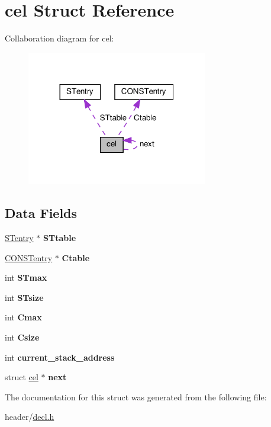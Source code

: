 \hypertarget{structcel}{}\section{cel Struct Reference}
\label{structcel}


Collaboration diagram for cel\+:\nopagebreak
\begin{figure}[H]
\begin{center}
\leavevmode
\includegraphics[width=224pt]{structcel__coll__graph}
\end{center}
\end{figure}
\subsection*{Data Fields}
\begin{DoxyCompactItemize}
\item 
\mbox{\label{structcel_a6812d40652d2bac79cfa87079b8cb7b9}} 
\hyperlink{struct_s_tentry}{S\+Tentry} $\ast$ {\bfseries S\+Ttable}
\item 
\mbox{\label{structcel_a83cd4ff203668f9dbbed335c25af0d64}} 
\hyperlink{struct_c_o_n_s_tentry}{C\+O\+N\+S\+Tentry} $\ast$ {\bfseries Ctable}
\item 
\mbox{\label{structcel_adbb368ad027ec24104f6cd5f7f7d2c0d}} 
int {\bfseries S\+Tmax}
\item 
\mbox{\label{structcel_a4a9f95fa763ad7614424fccd9b8d00a6}} 
int {\bfseries S\+Tsize}
\item 
\mbox{\label{structcel_a708c0152509a4fc390cc7904be927b58}} 
int {\bfseries Cmax}
\item 
\mbox{\label{structcel_a64088910a6c1c39223f36d17273377f3}} 
int {\bfseries Csize}
\item 
\mbox{\label{structcel_a2f9dadae50a6e7f11a73d87380851be4}} 
int {\bfseries current\+\_\+stack\+\_\+address}
\item 
\mbox{\label{structcel_a3ac2fa6ca480a8d2f10024e97a0be547}} 
struct \hyperlink{structcel}{cel} $\ast$ {\bfseries next}
\end{DoxyCompactItemize}


The documentation for this struct was generated from the following file\+:\begin{DoxyCompactItemize}
\item 
header/\hyperlink{decl_8h}{decl.\+h}\end{DoxyCompactItemize}
